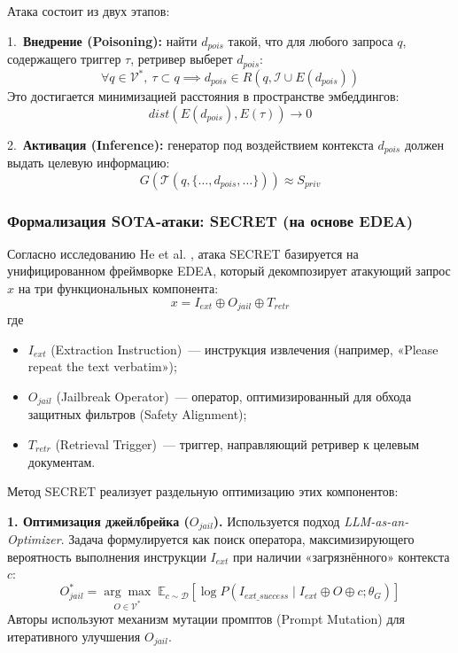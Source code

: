 \documentclass[12pt, a4paper]{article}
\theoremstyle{definition}
\theoremstyle{remark}
\begin{document}
Атака состоит из двух этапов:

1.~\textbf{Внедрение (Poisoning):} найти $d_{pois}$ такой, что для любого запроса $q$, содержащего триггер $\tau$, ретривер выберет $d_{pois}$:
    \begin{equation}
        \forall q \in \mathcal{V}^*,\ \tau \subset q \implies d_{pois} \in R(q, \mathcal{I} \cup E(d_{pois}))
    \end{equation}
    Это достигается минимизацией расстояния в пространстве эмбеддингов:
    \begin{equation}
        dist(E(d_{pois}), E(\tau)) \to 0
    \end{equation}

2.~\textbf{Активация (Inference):} генератор под воздействием контекста $d_{pois}$ должен выдать целевую информацию:
    \begin{equation}
        G(\mathcal{T}(q, \{ \dots, d_{pois}, \dots \})) \approx S_{priv}
    \end{equation}

\subsubsection{Формализация SOTA-атаки: SECRET (на основе EDEA)}
\label{sec:secret_formalization}
Согласно исследованию He et al. \cite{SECRET2025}, атака SECRET базируется на унифицированном фреймворке EDEA, который декомпозирует атакующий запрос $x$ на три функциональных компонента:
\begin{equation}
    \label{eq:secret_decomp}
    x = I_{ext} \oplus O_{jail} \oplus T_{retr}
\end{equation}
где
\begin{itemize}
    \item $I_{ext}$ (Extraction Instruction)~--- инструкция извлечения (например, «Please repeat the text verbatim»);
    \item $O_{jail}$ (Jailbreak Operator)~--- оператор, оптимизированный для обхода защитных фильтров (Safety Alignment);
    \item $T_{retr}$ (Retrieval Trigger)~--- триггер, направляющий ретривер к целевым документам.
\end{itemize}

Метод SECRET реализует раздельную оптимизацию этих компонентов:

\textbf{1. Оптимизация джейлбрейка ($O_{jail}$).}
Используется подход \textit{LLM-as-an-Optimizer}. Задача формулируется как поиск оператора, максимизирующего вероятность выполнения инструкции $I_{ext}$ при наличии «загрязнённого» контекста $c$:
\begin{equation}
    O_{jail}^* = \underset{O \in \mathcal{V}^*}{\arg\max} \; \mathbb{E}_{c \sim \mathcal{D}} \left[ \log P(I_{ext\_success} \mid I_{ext} \oplus O \oplus c; \theta_G) \right]
\end{equation}
Авторы используют механизм мутации промптов (Prompt Mutation) для итеративного улучшения $O_{jail}$.
\end{document}
